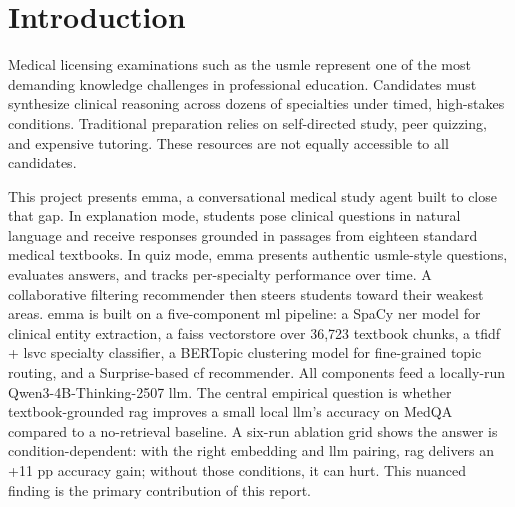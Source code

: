 \chapter{Introduction}

Medical licensing examinations such as the \gls{usmle} represent one of the most demanding knowledge challenges in professional education. Candidates must synthesize clinical reasoning across dozens of specialties under timed, high-stakes conditions. Traditional preparation relies on self-directed study, peer quizzing, and expensive tutoring. These resources are not equally accessible to all candidates. 

This project presents \gls{emma}, a conversational medical study agent built to close that gap. In explanation mode, students pose clinical questions in natural language and receive responses grounded in passages from eighteen standard medical textbooks. In quiz mode, \gls{emma} presents authentic \gls{usmle}-style questions, evaluates answers, and tracks per-specialty performance over time. A collaborative filtering recommender then steers students toward their weakest areas.
\gls{emma} is built on a five-component \gls{ml} pipeline: a SpaCy \gls{ner} model for clinical entity extraction, a \gls{faiss} vectorstore over 36,723 textbook chunks, a \gls{tfidf} + \gls{lsvc} specialty classifier, a BERTopic clustering model for fine-grained topic routing, and a Surprise-based \gls{cf} recommender. All components feed a locally-run Qwen3-4B-Thinking-2507 \gls{llm}. The central empirical question is whether textbook-grounded \gls{rag} improves a small local \gls{llm}'s accuracy on MedQA compared to a no-retrieval baseline. A six-run ablation grid shows the answer is condition-dependent: with the right embedding and \gls{llm} pairing, \gls{rag} delivers an +11 \gls{pp} accuracy gain; without those conditions, it can hurt. This nuanced finding is the primary contribution of this report.